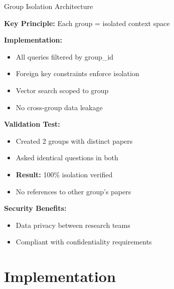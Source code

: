 \documentclass{beamer}
\begin{document}
\begin{frame}{Group Isolation Architecture}

\textbf{Key Principle:} Each group = isolated context space

\vspace{0.3cm}

\textbf{Implementation:}
\begin{itemize}
    \item All queries filtered by group\_id
    \item Foreign key constraints enforce isolation
    \item Vector search scoped to group
    \item No cross-group data leakage
\end{itemize}

\vspace{0.3cm}

\textbf{Validation Test:}
\begin{itemize}
    \item Created 2 groups with distinct papers
    \item Asked identical questions in both
    \item \textbf{Result:} 100\% isolation verified
    \item No references to other group's papers
\end{itemize}

\vspace{0.3cm}

\textbf{Security Benefits:}
\begin{itemize}
    \item Data privacy between research teams
    \item Compliant with confidentiality requirements
\end{itemize}

\end{frame}


\section{Implementation}
\end{document}
